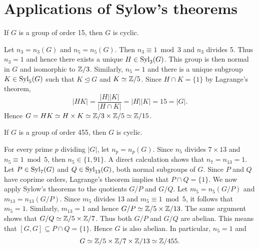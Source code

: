 \section{Applications of Sylow's theorems}
\lecture\label{sec:last}

\begin{example}
If $G$ is a group of order 15, then $G$ is cyclic.

Let $n_3=n_3(G)$ and $n_5=n_5(G)$. Then $n_3\equiv1\bmod 3$ and $n_3$ divides 5. Thus $n_3=1$ and hence there exists a unique
$H\in\mathrm{Syl}_3(G)$. This group is then normal in $G$ and isomorphic to
$\mathbb{Z}/3$. Similarly, 
 $n_5=1$ and there is a unique subgroup $K\in\mathrm{Syl}_5(G)$ such that
 $K\unlhd G$ and $K\simeq\mathbb{Z}/5$. Since $H\cap K=\{1\}$ by Lagrange's theorem, 
 \[
|HK|=\frac{|H||K|}{|H\cap K|}=|H||K|=15=|G|.
\]
Hence $G=HK\simeq H\times K\simeq \mathbb{Z}/3\times\mathbb{Z}/5\simeq\mathbb{Z}/15$.
\end{example}

\begin{example}
If $G$ is a group of order 455, then $G$ is cyclic.

For every prime $p$ dividing $|G|$, let $n_p=n_p(G)$. 
Since $n_5$ divides $7\times 13$ and
$n_5\equiv 1\bmod 5$, then $n_5\in\{1,91\}$. A direct 
calculation shows that $n_7=n_{13}=1$. Let $P\in\mathrm{Syl}_7(G)$ and  $Q\in\mathrm{Syl}_{13}(G)$, both normal subgroups of $G$. Since $P$ and $Q$ 
have coprime orders, Lagrange's theorem implies that 
$P\cap Q=\{1\}$.
We now apply Sylow's theorems to the quotients $G/P$ and $G/Q$.
Let $m_5=n_5(G/P)$ and $m_{13}=n_{13}(G/P)$. Since $m_5$ divides 13 and  $m_5\equiv1\bmod 5$, it follows that 
$m_5=1$. Similarly, $m_{13}=1$ and
hence $G/P\simeq\mathbb{Z}/5\times\mathbb{Z}/13$. The same argument shows that 
$G/Q\simeq\mathbb{Z}/5\times\mathbb{Z}/7$. Thus both $G/P$ and $G/Q$ are abelian. 
This means that 
$[G,G]\subseteq P\cap Q=\{1\}$. Hence $G$ is also abelian. 
In particular, $n_5=1$ and 
\[
G\simeq\mathbb{Z}/5\times\mathbb{Z}/7\times\mathbb{Z}/13\simeq\mathbb{Z}/455.
\]
\end{example}

